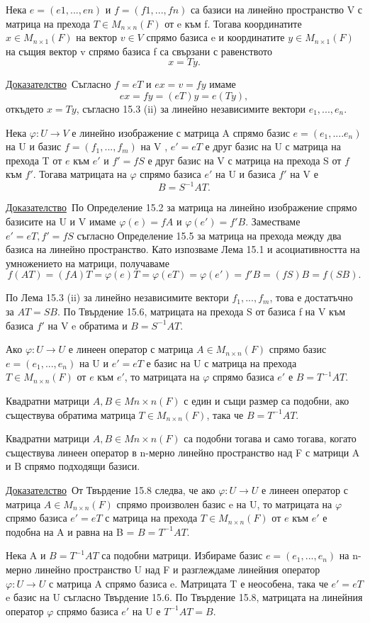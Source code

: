 \documentclass{article}
\newcommand{\dok}{\underline{Доказателство}\  }
\newcommand{\tvurdenie}[2]{
    \begin{tcolorbox}[title = #1 ,colframe = blue!70!black, colback = blue!10!white]
        #2
    \end{tcolorbox}
}
\newcommand{\opredelenie}[2]{
    \begin{tcolorbox}[title = #1 ,colframe = red!70!black, colback = red!10!white]
        #2
    \end{tcolorbox}
}
\begin{document}
\tvurdenie{Твърдение 15.7}{
    Нека $e = (e1, . . . , en)$ и $f = (f1, . . . , fn)$ са базиси на
    линейно пространство V с матрица на прехода $T \in M_{n\times n}(F)$ от e към
    f. Тогава координатите $x \in M_{n\times 1}(F)$ на вектор $v \in V$ спрямо базиса
    e и координатите $y \in M_{n\times 1}(F)$ на същия вектор v спрямо базиса f са
    свързани с равенството
    \[
        x = T y.
    \]
}

\dok Съгласно $f = eT$ и $ex = v = fy$ имаме
\[
    ex = fy = (eT)y = e(Ty),
\]
откъдето $x = Ty$, съгласно 15.3 (ii) за линейно независимите вектори $e_1, . . . , e_n$.

\tvurdenie{Твърдение 15.8}{
    Нека $\varphi : U \rightarrow V$ е линейно изображение с матрица A
    спрямо базис $e = (e_1, . . . .e_n)$ на U и базис $f = (f_1, . . . , f_m)$ на V ,
    $e' = eT$ е друг базис на U с матрица на прехода T от $e$ към $e'$ и $f' = fS$ е друг
    базис на V с матрица на прехода S от $f$ към $f'$. Тогава матрицата на
    $\varphi$ спрямо базиса $e'$ на U и базиса $f'$ на V е
    \[
        B = S^{-1}AT.
    \]
}
\dok По Определение 15.2 за матрица на линейно изображение спрямо базисите на U и V имаме $\varphi(e) = fA$ и
$\varphi(e') = f'B$. Заместваме $e' = eT, f'= fS$ съгласно Определение 15.5 за матрица на прехода между
два базиса на линейно пространство. Като изпозваме Лема 15.1 и асоциативността на умножението на матрици, получаваме
\[
    f(AT) = (fA)T = \varphi(e)T = \varphi(eT) = \varphi(e') = f'B = (fS)B = f(SB).
\]

По Лема 15.3 (ii) за линейно независимите вектори $f_1, . . . , f_m$, това е достатъчно
за $AT = SB$. По Твърдение 15.6, матрицата на прехода S от базиса f на V към
базиса $f'$ на V e обратима и $B = S^{-1}AT$.

Ако $\varphi : U \rightarrow U$ е линеен оператор с матрица $A \in M_{n\times n}(F)$ спрямо
базис $e = (e_1, . . . , e_n)$ на U и $e' = eT$ е базис на U с матрица на прехода $T \in M_{n\times n}(F)$
от $e$ към $e'$, то матрицата на $\varphi$ спрямо базиса $e'$ е $B = T^{-1}AT$.

\opredelenie{Определение 15.9}{
    Квадратни матрици $A, B \in M{n\times n}(F)$ с един и същи размер са подобни, ако съществува обратима
    матрица $T \in M_{n\times n}(F)$, така че  $B = T^{-1}AT$.
}
\tvurdenie{Твърдение 15.10}{
    Квадратни матрици $A,B \in M{n\times n}(F)$ са подобни тогава и само тогава, когато съществува
    линеен оператор в n-мерно линейно пространство над F с матрици A и B спрямо подходящи базиси.
}
\dok От Твърдение 15.8 следва, че ако $\varphi : U \rightarrow U$ е линеен
оператор с матрица $A \in M_{n\times n}(F)$ спрямо произволен базис e на U, то матрицата
на $\varphi$ спрямо базиса $e' = eT$ с матрица на прехода $T \in M_{n\times n}(F)$ от $e$ към $e'$
е подобна на A и равна на B = $B = T^{-1}AT$.

Нека A и $B = T^{-1}AT$ са подобни матрици. Избираме базис $e = (e_1, . . . , e_n)$
на n-мерно линейно пространство U над F и разглеждаме линейния оператор
$\varphi : U \rightarrow U$ с матрица A спрямо базиса e. Матрицата T е неособена, така че
$e' = eT$ e базис на U съгласно Твърдение 15.6. По Твърдение 15.8, матрицата
на линейния оператор $\varphi$ спрямо базиса $e'$ на U е $T^{-1}AT=B$.
\end{document}
